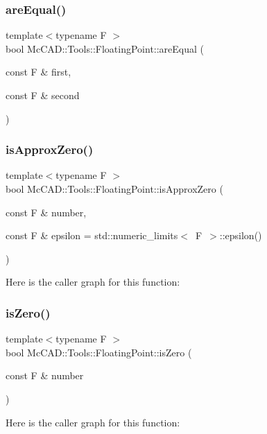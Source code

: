 \subsubsection{\texorpdfstring{are\+Equal()}{areEqual()}}
{\footnotesize\ttfamily template$<$typename F $>$ \\
bool Mc\+C\+A\+D\+::\+Tools\+::\+Floating\+Point\+::are\+Equal (\begin{DoxyParamCaption}\item[{const F \&}]{first,  }\item[{const F \&}]{second }\end{DoxyParamCaption})}

\mbox{\label{namespaceMcCAD_1_1Tools_1_1FloatingPoint_a92d14d494cb5fb205e46aad76a9a96b7}} 
\subsubsection{\texorpdfstring{is\+Approx\+Zero()}{isApproxZero()}}
{\footnotesize\ttfamily template$<$typename F $>$ \\
bool Mc\+C\+A\+D\+::\+Tools\+::\+Floating\+Point\+::is\+Approx\+Zero (\begin{DoxyParamCaption}\item[{const F \&}]{number,  }\item[{const F \&}]{epsilon = {\ttfamily std\+:\+:numeric\+\_\+limits$<$~F~$>$\+:\+:epsilon()} }\end{DoxyParamCaption})}

Here is the caller graph for this function\+:
\mbox{\label{namespaceMcCAD_1_1Tools_1_1FloatingPoint_a10fd15c76eb2901c2983aabad531d731}} 
\subsubsection{\texorpdfstring{is\+Zero()}{isZero()}}
{\footnotesize\ttfamily template$<$typename F $>$ \\
bool Mc\+C\+A\+D\+::\+Tools\+::\+Floating\+Point\+::is\+Zero (\begin{DoxyParamCaption}\item[{const F \&}]{number }\end{DoxyParamCaption})}

Here is the caller graph for this function\+:
